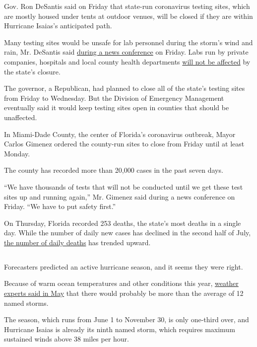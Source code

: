 Gov. Ron DeSantis said on Friday that state-run coronavirus testing
sites, which are mostly housed under tents at outdoor venues, will be
closed if they are within Hurricane Isaias's anticipated path.

Many testing sites would be unsafe for lab personnel during the storm's
wind and rain, Mr. DeSantis said
\href{https://www.youtube.com/watch?v=FsKIF5je_bo}{during a news
conference} on Friday. Labs run by private companies, hospitals and
local county health departments
\href{https://www.floridadisaster.org/news-media/news/20200729-all-state-supported-testing-sites-temporarily-close-for-potential-tropical-cyclone-nine/}{will
not be affected} by the state's closure.

The governor, a Republican, had planned to close all of the state's
testing sites from Friday to Wednesday. But the Division of Emergency
Management eventually said it would keep testing sites open in counties
that should be unaffected.

In Miami-Dade County, the center of Florida's coronavirus outbreak,
Mayor Carlos Gimenez ordered the county-run sites to close from Friday
until at least Monday.

The county has recorded more than 20,000 cases in the past seven days.

``We have thousands of tests that will not be conducted until we get
these test sites up and running again,'' Mr. Gimenez said during a news
conference on Friday. ``We have to put safety first.''

On Thursday, Florida recorded 253 deaths, the state's most deaths in a
single day. While the number of daily new cases has declined in the
second half of July,
\href{https://www.nytimes3xbfgragh.onion/interactive/2020/us/florida-coronavirus-cases.html}{the
number of daily deaths} has trended upward.

\hypertarget{-4}{%
\subsection{}\label{-4}}

Forecasters predicted an active hurricane season, and it seems they were
right.

Because of warm ocean temperatures and other conditions this year,
\href{https://www.nytimes3xbfgragh.onion/2020/05/21/climate/hurricane-season-2020-noaa.html}{weather
experts said in May} that there would probably be more than the average
of 12 named storms.

The season, which runs from June 1 to November 30, is only one-third
over, and Hurricane Isaias is already its ninth named storm, which
requires maximum sustained winds above 38 miles per hour.

